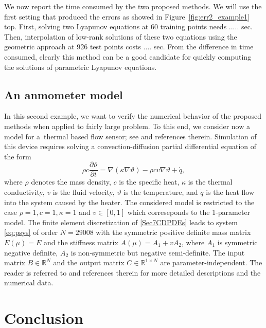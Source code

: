 We now report the time consumed by the two proposed methods. We will use the first setting that produced the errors as showed in Figure~\ref{fig:err2_example1} top. First, solving two Lyapunov equations at 60 training points needs ..... sec. Then, interpolation of low-rank solutions of these two equations using the geometric approach at 926 test points costs .... sec. From the difference in time consumed, clearly this method can be a good candidate for quickly computing the solutions of parametric Lyapunov equations. 



\subsection{An anmometer model}
In this second example, we want to verify the numerical behavior of the proposed methods when applied to fairly large problem. To this end, we consider now a model for a~thermal based flow sensor; see \cite{MoosRGKH05} and references therein. 
Simulation of this device requires solving a convection-diffusion partial differential equation of the form
\begin{equation}\label{Sec7CDPDEs}
\rho c \frac{\partial \vartheta}{\partial t} = \nabla(\kappa \nabla \vartheta)-\rho cv\nabla \vartheta +\dot{q},
\end{equation}
where $\rho$ denotes the mass density, $c$ %
 is the specific heat, $\kappa$
   is the thermal conductivity, 
$v$
 is the fluid velocity, $\vartheta$ is the temperature, and $\dot q$ is the heat flow into the system 
caused by the heater. The considered model is restricted to the case $\rho = 1, c = 1, \kappa = 1$ and $v \in [0,1]$ which correseponds to the 1-parameter model. The finite element discretization of 
\eqref{Sec7CDPDEs} leads to system \eqref{eq:psys} of order $N=29008$ with the symmetric positive definite mass matrix $E(\mu) = E$ 
and the stiffness matrix $A(\mu)=A_1+vA_2$, where 
$A_1$ is symmetric negative definite, $A_2$ is non-symmetric but negative semi-definite.
The input matrix $B\in\mathbb{R}^N$ and the output matrix $C\in\mathbb{R}^{1\times N}$ are parameter-independent.
The reader is referred to \cite{morwiki_anemom} and references therein for more detailed descriptions and the numerical data.



\section{Conclusion}\label{Sec:Concl}





